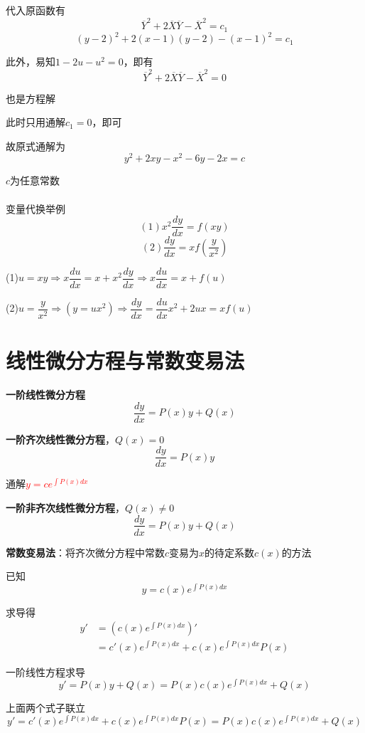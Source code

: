 \documentclass[oneside]{book} %
\begin{document}
代入原函数有
$$\overline{Y}^{2} + 2\overline{X}\overline{Y} - \overline{X}^{2} = c_{1}$$
$$(y - 2)^{2} + 2(x - 1)(y - 2) - (x - 1)^{2} = c_{1}$$

此外，易知$1 - 2u - u^{2} = 0$，即有
$$\overline{Y}^{2} + 2\overline{X}\overline{Y} - \overline{X}^{2} = 0$$

也是方程解

此时只用通解$c_{1} = 0$，即可

故原式通解为
$$y^{2} + 2xy - x^{2} - 6y - 2x = c$$

$c$为任意常数
\\ \hspace*{\fill} \\
\noindent {}变量代换举例
$$(1)x^{2}\dfrac{dy}{dx} = f(xy)$$
$$(2)\dfrac{dy}{dx} = xf\left(\dfrac{y}{x^{2}}\right) $$

(1)$u = xy \Rightarrow x\dfrac{du}{dx} = x + x^{2}\dfrac{dy}{dx} \Rightarrow x\dfrac{du}{dx} = x + f(u)$

(2)$u = \dfrac{y}{x^{2}} \Rightarrow (y = ux^{2}) \Rightarrow \dfrac{dy}{dx} = \dfrac{du}{dx}x^{2} + 2ux = xf(u)$

\newpage
\section{线性微分方程与常数变易法}
\noindent {}
\textbf{一阶线性微分方程}
$$\dfrac{dy}{dx} = P(x)y + Q(x)$$

\quad \textbf{一阶齐次线性微分方程}，$Q(x) = 0$
$$\dfrac{dy}{dx} = P(x)y $$

\quad \quad \quad 通解\textcolor{red}{$y = ce^{\int P(x) dx}$}


\quad \textbf{一阶非齐次线性微分方程}，$Q(x) \neq 0$
$$\dfrac{dy}{dx} = P(x)y + Q(x)$$


\noindent {}

\textbf{常数变易法}：将齐次微分方程中常数$c$变易为$x$的待定系数$c(x)$的方法

已知
$$y = c(x)e^{\int P(x) dx}$$

求导得
\begin{align*}
    y' & = \left(c(x)e^{\int P(x) dx}\right)' \\
    & = c'(x)e^{\int P(x) dx} + c(x)e^{\int P(x) dx}P(x)
\end{align*}

一阶线性方程求导
$$y' = P(x)y + Q(x) = P(x)c(x)e^{\int P(x) dx} + Q(x)$$

上面两个式子联立
$$y'= c'(x)e^{\int P(x) dx} + c(x)e^{\int P(x) dx}P(x) = P(x)c(x)e^{\int P(x) dx} + Q(x)$$
\end{document}
